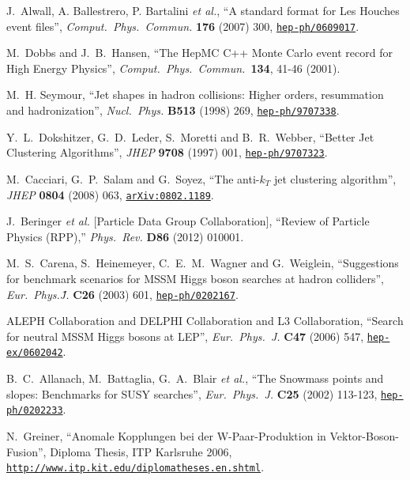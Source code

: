 \documentclass[english,12pt]{article}
\begin{document}
\begin{thebibliography}{10}
J.~Alwall, A. Ballestrero, P. Bartalini {\em et al.}, ``A standard format for Les Houches event files'', {\em
  Comput.\ Phys.\ Commun.} {\bf 176} (2007) 300,
\href{http://www.arXiv.org/abs/hep-ph/0609017}{{\tt hep-ph/0609017}}.

  M.~Dobbs and J.~B.~Hansen,
  ``The HepMC C++ Monte Carlo event record for High Energy Physics'',
  {\em Comput.\ Phys.\ Commun.\  }{\bf 134}, 41-46 (2001).

M.~H. Seymour, ``{Jet shapes in hadron collisions: Higher orders, resummation
  and hadronization}'', {\em Nucl.\ Phys.} {\bf B513} (1998) 269,
\href{http://www.arXiv.org/abs/hep-ph/9707338}{{\tt hep-ph/9707338}}.

  Y.~L.~Dokshitzer, G.~D.~Leder, S.~Moretti and B.~R.~Webber,
  ``Better Jet Clustering Algorithms'',
  {\em JHEP} {\bf 9708} (1997) 001,
  \href{http://arxiv.org/abs/hep-ph/9707323}{{\tt hep-ph/9707323}}.

  M.~Cacciari, G.~P.~Salam and G.~Soyez,
  ``The anti-$k_T$ jet clustering algorithm'',
  {\em JHEP} {\bf 0804} (2008) 063,
  \href{http://arxiv.org/abs/0802.1189}{{\tt arXiv:0802.1189}}.

  J.~Beringer {\it et al.}  [Particle Data Group Collaboration],
  ``Review of Particle Physics (RPP),''
   {\em Phys.\ Rev.} {\bf D86} (2012) 010001.

  M.~S.~Carena, S.~Heinemeyer, C.~E.~M.~Wagner and G.~Weiglein,
  ``Suggestions for benchmark scenarios for MSSM Higgs boson searches at
  hadron colliders'',
  {\em Eur.\ Phys.\~J.} {\bf C26} (2003) 601,
\href{http://www.arXiv.org/abs/hep-ph/0202167}{{\tt hep-ph/0202167}}.

  ALEPH Collaboration and DELPHI Collaboration and L3 Collaboration,
  ``Search for neutral MSSM Higgs bosons at LEP'',
  {\em Eur.\ Phys.\ J.} {\bf C47} (2006) 547,
\href{http://www.arXiv.org/abs/hep-ex/0602042}{{\tt hep-ex/0602042}}.

  B.~C.~Allanach, M.~Battaglia, G.~A.~Blair {\it et al.},
  ``The Snowmass points and slopes: Benchmarks for SUSY searches'',
  {\em Eur.\ Phys.\ J.}  {\bf C25} (2002) 113-123,
\href{http://www.arXiv.org/abs/hep-ph/0202233}{{\tt hep-ph/0202233}}.
  
N.~Greiner, ``Anomale Kopplungen bei der W-Paar-Produktion in
  Vektor-Boson-Fusion'', {Diploma Thesis, ITP Karlsruhe 2006},
\href{http://www.itp.kit.edu/diplomatheses.en.shtml}{{\tt http://www.itp.kit.edu/diplomatheses.en.shtml}}.


\end{thebibliography}
\end{document}
